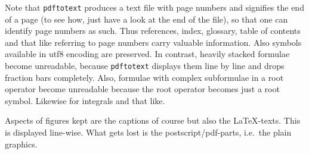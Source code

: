 Note that \texttt{pdftotext} produces a text file with page numbers 
and signifies the end of a page 
(to see how, just have a look at the end of the file), 
so that one can identify page numbers as such. 
Thus references, index, glossary, table of contents and that like 
referring to page numbers carry valuable information. 
Also symbols available in utf8 encoding are preserved. 
In contrast, heavily stacked formulae become unreadable, 
because \texttt{pdftotext} displays them line by line 
and drops fraction bars completely. 
Also, formulae with complex subformulae in a root operator  
become unreadable because the root operator becomes just a root symbol. 
Likewise for integrals and that like. 

Aspects of figures kept are the captions of course but also the \LaTeX-texts. 
This is displayed line-wise. 
What gets lost is the postscript/pdf-parts, i.e.~the plain graphics. 

\raggedbottom{}

